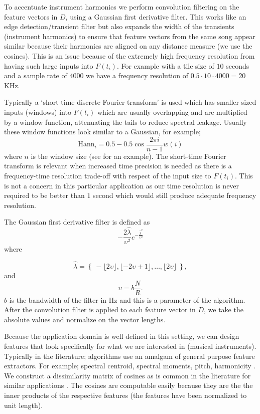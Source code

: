 \documentclass[twocolumn]{article}
\begin{document}
	To accentuate instrument harmonics we perform convolution filtering on the feature vectors in $D$, using a Gaussian first derivative filter. This works like an edge detection/transient filter but also expands the width of the transients (instrument harmonics) to ensure that feature vectors from the same song appear similar because their harmonics are aligned on any distance measure (we use the cosines). This is an issue because of the extremely high frequency resolution from having such large inputs into $F(t_i)$. For example with a tile size of $10$ seconds and a sample rate of $4000$ we have a frequency resolution of $0.5 \cdot 10 \cdot 4000 = 20$KHz. 
	
	Typically a `short-time discrete Fourier transform' is used which has smaller sized inputs (windows) into $F(t_i)$ which are usually overlapping and are multiplied by a window function, attenuating the tails to reduce spectral leakage. Usually these window functions look similar to a Gaussian, for example;  
	\[
	\mathrm{Hann}_i = 0.5 - 0.5 \cos\frac{2\pi i}{n-1}{w(i)}
	\] where $n$ is the window size
	(see \cite{tzanetakis1999multifeature} for an example). The short-time Fourier transform is relevant when increased time precision is needed as there is a frequency-time resolution trade-off with respect of the input size to $F(t_i)$. This is not a concern in this particular application as our time resolution is never required to be better than $1$ second which would still produce adequate frequency resolution.
	
	The Gaussian first derivative filter is defined as 
	$$- \frac{2 \hat{\lambda}}{\upsilon^2}  e^{-\frac{\hat{\lambda}^2}{\upsilon^2}} $$ where 
	
	$$\hat{\lambda}=\left\{~-\lfloor 2\upsilon\rfloor,\lfloor-2\upsilon+1\rfloor,\ldots, \lfloor 2 \upsilon \rfloor~\right\},$$ and $$\upsilon = b  \frac{N}{R} .$$ $b$ is the bandwidth of the filter in Hz and this is a parameter of the algorithm. After the convolution filter is applied to each feature vector in $D$, we take the absolute values and normalize on the vector lengths.  
	
	Because the application domain is well defined in this setting, we can design features that look specifically for what we are interested in (musical instruments). Typically in the literature; algorithms use an amalgam of general purpose feature extractors. For example; spectral centroid, spectral moments, pitch, harmonicity \cite{tzanetakis1999framework}. We construct a dissimilarity matrix of cosines as is common in the literature for similar applications \cite{foote1999visualizing}. The cosines are computable easily because they are the the inner products of the respective features (the features have been normalized to unit length).
	
\end{document}
